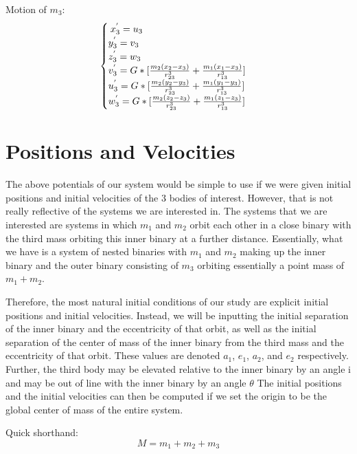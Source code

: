 \documentclass[letterpaper,12pt]{article}
\begin{document}
Motion of $m_{3}$:
\begin{equation}
\begin{cases}
\hspace{0.22em} x_{3}^{'} = u_{3}\\
y_{3}^{'} = v_{3}\\
z_{3}^{'} = w_{3}\\
v_{3}^{'} = G*[\frac{m_{2}(x_{2}-x_{3})}{r_{23}^{3}}+\frac{m_{1}(x_{1}-x_{3})}{r_{13}^{3}}]\\
u_{3}^{'} =G*[\frac{m_{2}(y_{2}-y_{3})}{r_{23}^{3}}+\frac{m_{1}(y_{1}-y_{3})}{r_{13}^{3}}]\\
w_{3}^{'} =G*[\frac{m_{2}(z_{2}-z_{3})}{r_{23}^{3}}+\frac{m_{1}(z_{1}-z_{3})}{r_{13}^{3}}]\\
\end{cases}
\label{eq:potential}
\end{equation}

\section{Positions and Velocities}

The above potentials of our system would be simple to use if we were given initial positions and initial velocities of the 3 bodies of interest. However, that is not really reflective of the systems we are interested in. The systems that we are interested are systems in which $m_{1}$ and $m_{2}$ orbit each other in a close binary with the third mass orbiting this inner binary at a further distance. Essentially, what we have is a system of nested binaries with $m_{1}$ and $m_{2}$ making up the inner binary and the outer binary consisting of $m_{3}$ orbiting essentially a point mass of $m_{1} + m_{2}$. 

Therefore, the most natural initial conditions of our study are explicit initial positions and initial velocities. Instead, we will be inputting the initial separation of the inner binary and the eccentricity of that orbit, as well as the initial separation of the center of mass of the inner binary from the third mass and the eccentricity of that orbit. These values are denoted $a_{1}$, $e_{1}$, $a_{2}$, and $e_{2}$ respectively. Further, the third body may be elevated relative to the inner binary by an angle i and may be out of line with the inner binary by an angle $\theta$ The initial positions and the initial velocities can then be computed if we set the origin to be the global center of mass of the entire system.

Quick shorthand:
\begin{equation}
M = m_{1} + m_{2} +m_{3}
\end{equation}
\end{document}
